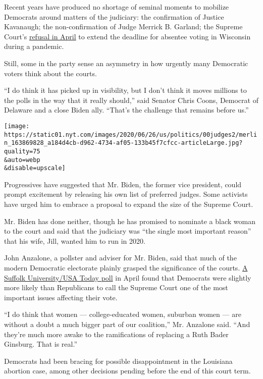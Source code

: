 Recent years have produced no shortage of seminal moments to mobilize
Democrats around matters of the judiciary: the confirmation of Justice
Kavanaugh; the non-confirmation of Judge Merrick B. Garland; the Supreme
Court's
\href{https://www.nytimes.com/2020/04/06/us/politics/supreme-court-voting-wisconsin-virus.html}{refusal
in April} to extend the deadline for absentee voting in Wisconsin during
a pandemic.

Still, some in the party sense an asymmetry in how urgently many
Democratic voters think about the courts.

``I do think it has picked up in visibility, but I don't think it moves
millions to the polls in the way that it really should,'' said Senator
Chris Coons, Democrat of Delaware and a close Biden ally. ``That's the
challenge that remains before us.''

\texttt{[image: https://static01.nyt.com/images/2020/06/26/us/politics/00judges2/merlin\_163869828\_a184d4cb-d962-4734-af05-133b45f7cfcc-articleLarge.jpg?quality=75\\\&auto=webp\\\&disable=upscale]}

Progressives have suggested that Mr. Biden, the former vice president,
could prompt excitement by releasing his own list of preferred judges.
Some activists have urged him to embrace a proposal to expand the size
of the Supreme Court.

Mr. Biden has done neither, though he has promised to nominate a black
woman to the court and said that the judiciary was ``the single most
important reason'' that his wife, Jill, wanted him to run in 2020.

John Anzalone, a pollster and adviser for Mr. Biden, said that much of
the modern Democratic electorate plainly grasped the significance of the
courts.
\href{https://www.suffolk.edu/news-features/news/2020/04/28/18/13/poll-shows-voters-want-federal-government-more-involved-in-the-coronavirus-health-response}{A
Suffolk University/USA Today poll} in April found that Democrats were
slightly more likely than Republicans to call the Supreme Court one of
the most important issues affecting their vote.

``I do think that women --- college-educated women, suburban women ---
are without a doubt a much bigger part of our coalition,'' Mr. Anzalone
said. ``And they're much more awake to the ramifications of replacing a
Ruth Bader Ginsburg. That is real.''

Democrats had been bracing for possible disappointment in the Louisiana
abortion case, among other decisions pending before the end of this
court term.

